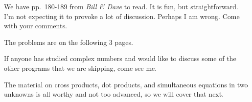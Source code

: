 \bigskip

\nobreak\bigskip

\noindent We have pp.~180-189 from {\it Bill \& Dave} to read. It is fun, but straightforward. I'm not expecting it to provoke a lot of discussion. Perhaps I am wrong. Come with your comments.

\bigskip

\nobreak\bigskip

\noindent The problems are on the following 3 pages.

\bigskip

\nobreak\bigskip

\noindent If anyone has studied complex numbers and would like to discuss some of the other programs that we are skipping, come see me.

The material on cross products, dot products, and simultaneous equations in two unknowns is all worthy and not too advanced, so we will cover that next.

\bye
